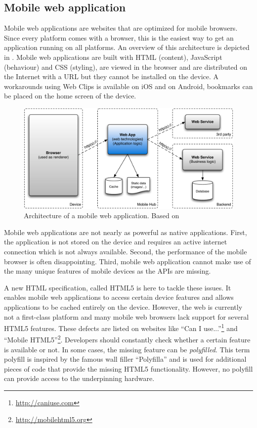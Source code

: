 \subsection{Mobile web application}

Mobile web applications are websites that are optimized for mobile browsers. Since every platform comes with a browser, this is the easiest way to get an application running on all platforms. An overview of this architecture is depicted in . Mobile web applications are built with HTML (content), JavaScript (behaviour) and CSS (styling), are viewed in the browser and are distributed on the Internet with a URL but they cannot be installed on the device. A workarounds using Web Clips \cite{Safari:webclips} is available on iOS and on Android, bookmarks can be placed on the home screen of the device. 

\begin{figure}[h]
    \begin{center}
        \includegraphics[width=\textwidth]{../resources/figs/web.pdf}
        \caption{Architecture of a mobile web application. Based on \cite{Friese}}
        \label{fig:web}
    \end{center}
\end{figure}

Mobile web applications are not nearly as powerful as native applications. First, the application is not stored on the device and requires an active internet connection which is not always available. Second, the performance of the mobile browser is often disappointing. Third, mobile web application cannot make use of the many unique features of mobile devices as the APIs are missing.

A new HTML specification, called HTML5 is here to tackle these issues. It enables mobile web applications to access certain device features and allows applications to be cached entirely on the device. However, the web is currently not a first-class platform and many mobile web browsers lack support for several HTML5 features. These defects are listed on websites like ``Can I use...''\footnote{\url{http://caniuse.com}} and ``Mobile HTML5''\footnote{\url{http://mobilehtml5.org}}. Developers should constantly check whether a certain feature is available or not. In some cases, the missing feature can be \emph{polyfilled}. This term polyfill is inspired by the famous wall filler ``Polyfilla'' and is used for additional pieces of code that provide the missing HTML5 functionality. However, no polyfill can provide access to the underpinning hardware. 

